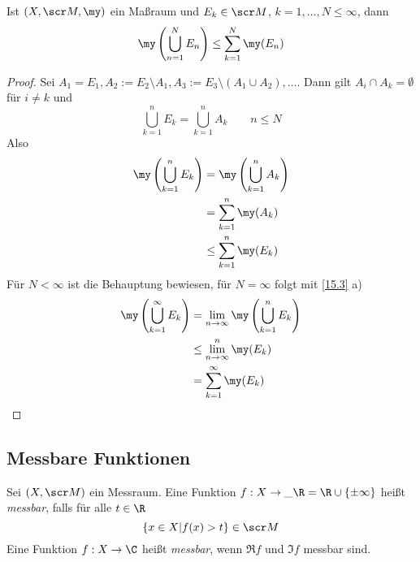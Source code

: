 \documentclass[a4paper,10pt]{scrartcl}
\begin{document}
\begin{lem}
	\label{15.4}
	Ist $(X,\scr M,\my)$ ein Maßraum und $E_k\in \scr M$, $k=1,\dotsc, N\le \infty$, dann
	\[
		\my\left(\bigcup_{n=1}^N E_n\right) \le \sum_{k=1}^N \my(E_n)
	\]
	\begin{proof}
		Sei $A_1=E_1, A_2 := E_2 \setminus A_1, A_3 := E_3 \setminus (A_1\cup A_2), \dotsc $.
		Dann gilt $A_i \cap A_k = \emptyset$ für $i\neq k$ und
		\[
			\bigcup_{k=1}^n E_k = \bigcup_{k=1}^n A_k \qquad n\le N
		\]
		Also
		\begin{align*}
		\my\left(\bigcup_{k=1}^n E_k\right) &= \my\left( \bigcup_{k=1}^n A_k\right)\\
																														&=\sum_{k=1}^n \my(A_k) \\
									   &\le \sum_{k=1}^n \my(E_k)
		\end{align*}
		Für $N< \infty$ ist die Behauptung bewiesen, für $N=\infty$ folgt mit \ref{15.3} a)
		\begin{align*}
			\my\left(\bigcup_{k=1}^\infty E_k\right) &= \lim_{n\to\infty}\my\left(\bigcup_{k=1}^n E_k\right) \\
																								   &\le \lim_{n\to \infty}^n\my(E_k) \\
									&=\sum_{k=1}^\infty \my(E_k)
		\end{align*}
	\end{proof}
\end{lem}


\subsection{Messbare Funktionen}

\begin{df*}
	Sei $(X,\scr M)$ ein Messraum.
	Eine Funktion $f: X\to \_\R = \R\cup \{\pm \infty\}$ heißt \emph{messbar}, falls für alle $t\in \R$
	\[
		\{x\in X|f(x)>t\} \in \scr M
	\]
	Eine Funktion $f:X\to \C$ heißt \emph{messbar}, wenn $\Re f$ und $\Im f$ messbar sind.
\end{df*}
\end{document}
